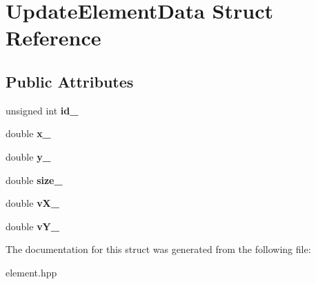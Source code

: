 \hypertarget{structUpdateElementData}{}\section{Update\+Element\+Data Struct Reference}
\label{structUpdateElementData}
\subsection*{Public Attributes}
\begin{DoxyCompactItemize}
\item 
unsigned int {\bfseries id\+\_\+}\hypertarget{structUpdateElementData_a1a3514e0665d80284718b776a32eccbe}{}\label{structUpdateElementData_a1a3514e0665d80284718b776a32eccbe}

\item 
double {\bfseries x\+\_\+}\hypertarget{structUpdateElementData_a1ea1ab4fda073dd2f015b2220f3fc632}{}\label{structUpdateElementData_a1ea1ab4fda073dd2f015b2220f3fc632}

\item 
double {\bfseries y\+\_\+}\hypertarget{structUpdateElementData_ae141528c38fa3379a7ea7ea25c42f873}{}\label{structUpdateElementData_ae141528c38fa3379a7ea7ea25c42f873}

\item 
double {\bfseries size\+\_\+}\hypertarget{structUpdateElementData_a869c55696b410144b51230917333725b}{}\label{structUpdateElementData_a869c55696b410144b51230917333725b}

\item 
double {\bfseries v\+X\+\_\+}\hypertarget{structUpdateElementData_a371672cd72721832a687534d7fcffda8}{}\label{structUpdateElementData_a371672cd72721832a687534d7fcffda8}

\item 
double {\bfseries v\+Y\+\_\+}\hypertarget{structUpdateElementData_a8ef5996e48b498ddeb3decf1a5ccb00b}{}\label{structUpdateElementData_a8ef5996e48b498ddeb3decf1a5ccb00b}

\end{DoxyCompactItemize}


The documentation for this struct was generated from the following file\+:\begin{DoxyCompactItemize}
\item 
element.\+hpp\end{DoxyCompactItemize}
